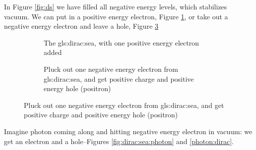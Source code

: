 \documentclass[]{article}
\begin{document}
In Figure \ref{fig:ds} we have filled all negative energy levels, which stabilizes vacuum. We can put in a positive energy electron, Figure \ref{fig:aqm-10-dirac-sea}, or take out a negative energy electron and leave a hole, Figure \ref{fig:dirac:sea}
\begin{figure}[H]
	\begin{center}
		\caption[The \gls{gls:dirac:sea}]{The\gls{gls:dirac:sea}: all negative energy states have been filled.}\label{fig:ds}
		\begin{subfigure}[b]{0.45\textwidth}
			\begin{center}
				\caption{The \gls{gls:dirac:sea}, with one positive energy electron added}\label{fig:aqm-10-dirac-sea}
			\end{center}
		\end{subfigure}
		\hfill
		\begin{subfigure}[b]{0.45\textwidth}
			\begin{center}
				\caption{Pluck out one negative energy electron from \gls{gls:dirac:sea}, and get positive charge and positive energy hole (positron)}\label{fig:dirac:sea}
			\end{center}
		\end{subfigure}
	\end{center}
\end{figure}

Imagine photon coming along and hitting negative energy electron in vacuum: we get an electron and a hole--Figures \ref{fig:dirac:sea:photon} and \ref{photon:dirac}.
\end{document}
